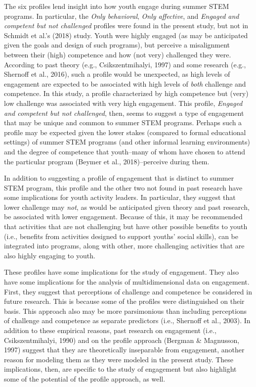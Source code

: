 \documentclass[]{book}
\theoremstyle{definition}
\theoremstyle{definition}
\theoremstyle{definition}
\theoremstyle{remark}
\begin{document}
The six profiles lend insight into how youth engage during summer STEM
programs. In particular, the \emph{Only behavioral}, \emph{Only
affective}, and \emph{Engaged and competent but not challenged} profiles
were found in the present study, but not in Schmidt et al.'s (2018)
study. Youth were highly engaged (as may be anticipated given the goals
and design of such programs), but perceive a misalignment between their
(high) competence and how (not very) challenged they were. According to
past theory (e.g., Csikszentmihalyi, 1997) and some research (e.g.,
Shernoff et al., 2016), such a profile would be unexpected, as high
levels of engagement are expected to be associated with high levels of
\emph{both} challenge and competence. In this study, a profile
characterized by high competence but (very) low challenge was associated
with very high engagement. This profile, \emph{Engaged and competent but
not challenged}, then, seems to suggest a type of engagement that may be
unique and common to summer STEM programs. Perhaps such a profile may be
expected given the lower stakes (compared to formal educational
settings) of summer STEM programs (and other informal learning
environments) and the degree of competence that youth--many of whom have
chosen to attend the particular program (Beymer et al., 2018)--perceive
during them.

In addition to suggesting a profile of engagement that is distinct to
summer STEM program, this profile and the other two not found in past
research have some implications for youth activity leaders. In
particular, they suggest that lower challenge may \emph{not}, as would
be anticipated given theory and past research, be associated with lower
engagement. Because of this, it may be recommended that activities that
are not challenging but have other possible benefits to youth (i.e.,
benefits from activities designed to support youths' social skills), can
be integrated into programs, along with other, more challenging
activities that are also highly engaging to youth.

These profiles have some implications for the study of engagement. They
also have some implications for the analysis of multidimensional data on
engagement. First, they suggest that perceptions of challenge and
competence be considered in future research. This is because some of the
profiles were distinguished on their basis. This approach also may be
more parsimonious than including perceptions of challenge and competence
as separate predictors (i.e., Shernoff et al., 2003). In addition to
these empirical reasons, past research on engagement (i.e.,
Csikszentmihalyi, 1990) and on the profile approach (Bergman \&
Magnusson, 1997) suggest that they are theoretically inseparable from
engagement, another reason for modeling them as they were modeled in the
present study. These implications, then, are specific to the study of
engagement but also highlight some of the potential of the profile
approach, as well.
\end{document}
